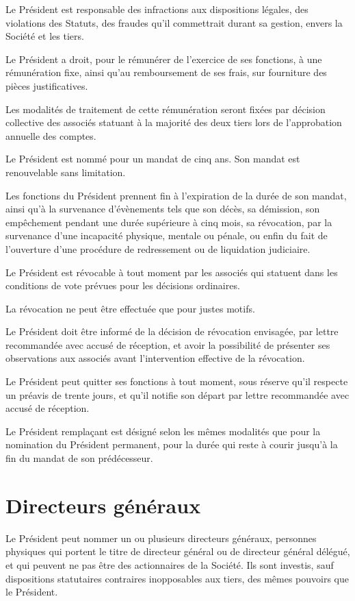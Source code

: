 \documentclass[a4paper,12pt]{report}
\begin{document}
Le Président est responsable des infractions aux dispositions légales, des violations des Statuts, des fraudes qu'il commettrait durant sa gestion, 
envers la Société et les tiers.

Le Président a droit, pour le rémunérer de l'exercice de ses fonctions, à une rémunération fixe, ainsi qu'au remboursement de ses frais, 
sur fourniture des pièces justificatives.

Les modalités de traitement de cette rémunération seront fixées par décision collective des associés statuant à la majorité des deux tiers 
lors de l'approbation annuelle des comptes.

Le Président est nommé pour un mandat de cinq ans. Son mandat est renouvelable sans limitation.

Les fonctions du Président prennent fin à l'expiration de la durée de son mandat, ainsi qu'à la survenance d'évènements tels que son décès, 
sa démission, son empêchement pendant une durée supérieure à cinq mois, sa révocation, par la survenance d'une incapacité physique, mentale ou pénale, 
ou enfin du fait de l'ouverture d'une procédure de redressement ou de liquidation judiciaire.

Le Président est révocable à tout moment par les associés qui statuent dans les conditions de vote prévues pour les décisions ordinaires.

La révocation ne peut être effectuée que pour justes motifs.

Le Président doit être informé de la décision de révocation envisagée, par lettre recommandée avec accusé de réception, 
et avoir la possibilité de présenter ses observations aux associés avant l'intervention effective de la révocation.

Le Président peut quitter ses fonctions à tout moment, sous réserve qu'il respecte un préavis de trente jours, 
et qu'il notifie son départ par lettre recommandée avec accusé de réception. 

Le Président remplaçant est désigné selon les mêmes modalités que pour la nomination du Président permanent, 
pour la durée qui reste à courir jusqu'à la fin du mandat de son prédécesseur.

\section{Directeurs généraux}
Le Président peut nommer un ou plusieurs directeurs généraux, personnes physiques qui portent le titre de directeur général 
ou de directeur général délégué, et qui peuvent ne pas être des actionnaires de la Société. 
Ils sont investis, sauf dispositions statutaires contraires inopposables aux tiers, des mêmes pouvoirs que le Président.
\end{document}
